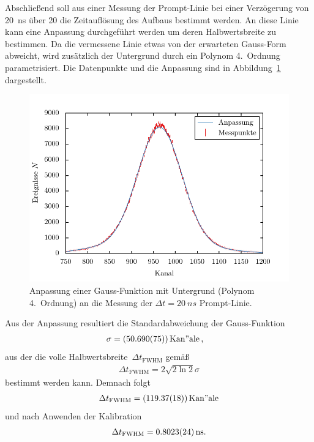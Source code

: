 \documentclass[11pt, a4paper]{article}
\numberwithin{equation}{section}
\begin{document}
Abschließend soll aus einer Messung der Prompt-Linie bei einer Verzögerung von \SI{20}{ns} über \SI{20}{\min} die Zeitauflösung des Aufbaus bestimmt werden.
An diese Linie kann eine Anpassung durchgeführt werden um deren Halbwertsbreite zu bestimmen.
Da die vermessene Linie etwas von der erwarteten Gauss-Form abweicht, wird zusätzlich der Untergrund durch ein Polynom 4.\ Ordnung parametrisiert.
Die Datenpunkte und die Anpassung sind in Abbildung~\ref{fig:promptkurve_einzeln} dargestellt.
\begin{figure}[h]
	\centering
	\includegraphics{./figures/fwhm_fit.pdf}
	\caption{Anpassung einer Gauss-Funktion mit Untergrund (Polynom 4.\ Ordnung) an die Messung der $\Delta t = \SI{20}{ns}$ Prompt-Linie.}
	\label{fig:promptkurve_einzeln}
\end{figure}
Aus der Anpassung resultiert die Standardabweichung der Gauss-Funktion
\begin{align*}
	\sigma &= (\num{50.690 +- 0.075}) \, \mathrm{Kan"ale} \, \text{,}
\end{align*}
aus der die volle Halbwertsbreite~$\Delta t_\mathrm{FWHM}$ gemäß
\begin{align*}
	\Delta t_\mathrm{FWHM} = 2 \sqrt{2\ln 2} \sigma
\end{align*}
bestimmt werden kann.
Demnach folgt
\begin{align*}
	\Delta t_\mathrm{FWHM} = (\num{119.37 +- 0.18}) \, \mathrm{Kan"ale}
\end{align*}
und nach Anwenden der Kalibration
\begin{align*}
	\Delta t_\mathrm{FWHM} = \SI{0.8023 +- 0.0024}{\nano\second} \text{.}
\end{align*}
\end{document}
